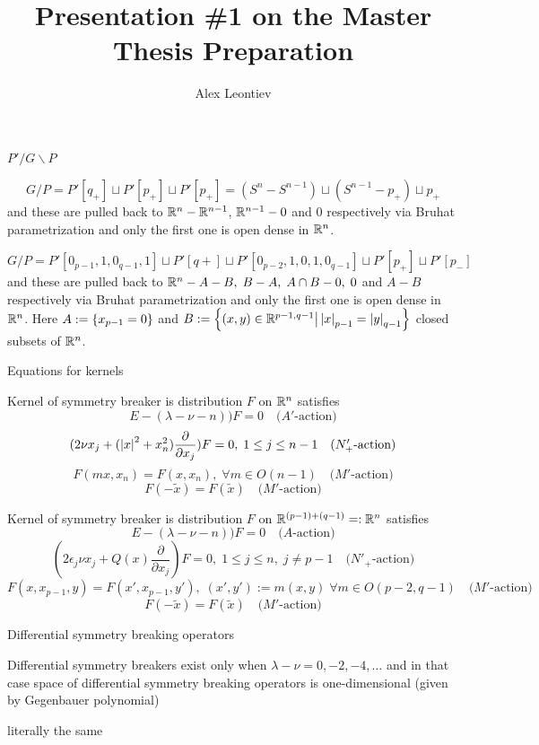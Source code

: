 \documentclass[8pt]{beamer}
\title{Presentation \#1 on the Master Thesis Preparation}
\subtitle{Alex Leontiev}
\theoremstyle{mystyle}
\begin{document}
\begin{frame}\titlepage\end{frame}
\begin{frame}{$P'/G\backslash P$}
	\begin{theorem}\[G/P=P'[q_+]\sqcup P'[p_+]\sqcup P'[p_+]=
		(S^n-S^{n-1})\sqcup (S^{n-1}-{p_+})\sqcup p_+\]
		and these are pulled back to $\mathbb{R}^n-\mathbb{R}^{n-1}$, $\mathbb{R}^{n-1}-0$ and $0$ respectively via Bruhat parametrization and
		only the first one is open dense in $\mathbb{R}^n$.
\end{theorem}
\begin{theorem}[$O(p,q),\;n:=(p-1)+(q-1)$]
	\[G/P=P'[0_{p-1},1,0_{q-1},1]\sqcup P'[q+]\sqcup P'[0_{p-2},1,0,1,0_{q-1}]\sqcup P'[p_+]\sqcup P'[p_-]\]
	and these are pulled back to $\mathbb{R}^n-A-B,\;B-A,\;A\cap B-{0},\;{0}$ and $A-B$ respectively via Bruhat parametrization and
		only the first one is open dense in $\mathbb{R}^n$.
Here $A:=\left\{x_{p-1}=0\right\}$ and $B:=\left\{(x,y)\in\mathbb{R}^{p-1,q-1}\big| \left|x\right|_{p-1}=\left|y\right|_{q-1}\right\}$ closed subsets of $\mathbb{R}^n$.
\end{theorem}
\end{frame}
\begin{frame}{Equations for kernels}
\begin{theorem}Kernel of symmetry breaker is distribution $F$ on $\mathbb{R}^n$ satisfies
	\[E-(\lambda-\nu-n))F=0\quad\mbox{($A'$-action)}\]
\[(2\nu x_j+(\left|x\right|^2+x_n^2)\frac{\partial}{\partial x_j})F=0,\;1\leq j\leq n-1\quad\mbox{($N_+'$-action)}\]
\[F(mx,x_n)=F(x,x_n),\;\forall m\in O(n-1)\quad\mbox{($M'$-action)}\]
\[F(-\tilde{x})=F(\tilde{x})\quad\mbox{($M'$-action)}\]
\end{theorem}
\begin{theorem}Kernel of symmetry breaker is distribution $F$ on $\mathbb{R}^{(p-1)+(q-1)}=:\mathbb{R}^n$ satisfies
\[E-(\lambda-\nu-n))F=0\quad\mbox{($A$-action)}\]
\[(2\epsilon_j\nu x_j+Q(x)\frac{\partial}{\partial x_j})F=0,\;1\leq j\leq n,\;j\neq p-1\quad\mbox{
($N'_+$-action)}\]
\[F(x,x_{p-1},y)=F(x',x_{p-1},y'),\;(x',y'):=m(x,y)\;\forall m\in O(p-2,q-1)\quad\mbox{($M'$-action)}\]
\[F(-\tilde{x})=F(\tilde{x})\quad\mbox{($M'$-action)}\]
\end{theorem}
\end{frame}
\begin{frame}{Differential symmetry breaking operators}
\begin{theorem}
	Differential symmetry breakers exist only when $\lambda-\nu=0,-2,-4,\hdots$ and in that case space of
	differential symmetry breaking operators is one-dimensional (given by Gegenbauer polynomial)
\end{theorem}
\begin{theorem}[$O(p,q),\;n:=(p-1)+(q-1)$]
	literally the same
\end{theorem}
\end{frame}
\end{document}
